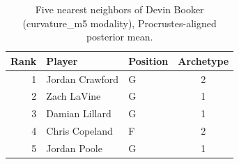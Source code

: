 \begin{table}[htbp]
  \centering\small
  \begin{tabular}{rllc}
    \toprule
    Rank & Player & Position & Archetype \\
    \midrule
    1 & Jordan Crawford & G & 2 \\
    2 & Zach LaVine & G & 1 \\
    3 & Damian Lillard & G & 1 \\
    4 & Chris Copeland & F & 2 \\
    5 & Jordan Poole & G & 1 \\
    \bottomrule
  \end{tabular}
  \caption{Five nearest neighbors of Devin Booker (curvature_m5 modality), Procrustes-aligned posterior mean.}
  \label{tab:Devin_Booker_neighbors_curvature_m5}
\end{table}

